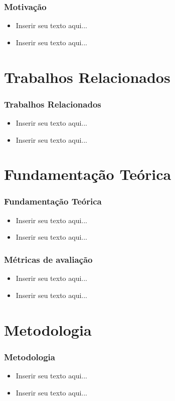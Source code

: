 \documentclass[aspectratio=34, 14pt]{latex-slides}
\begin{document}
\begin{frame}
    \frametitle{Motivação}

    \begin{itemize}
        \item Inserir seu texto aqui...
        \item Inserir seu texto aqui...
    \end{itemize}
\end{frame}

\section{Trabalhos Relacionados}
\begin{frame}
    \frametitle{Trabalhos Relacionados}

    \begin{itemize}
        \item Inserir seu texto aqui...
        \item Inserir seu texto aqui...
    \end{itemize}
\end{frame}

\section{Fundamentação Teórica}
\begin{frame}
    \frametitle{Fundamentação Teórica}

    \begin{itemize}
        \item Inserir seu texto aqui...
        \item Inserir seu texto aqui...
    \end{itemize}
\end{frame}

\begin{frame}
    \frametitle{Métricas de avaliação}

    \begin{itemize}
        \item Inserir seu texto aqui...
        \item Inserir seu texto aqui...
    \end{itemize}
\end{frame}

\section{Metodologia}
\begin{frame}
    \frametitle{Metodologia}

    \begin{itemize}
        \item Inserir seu texto aqui...
        \item Inserir seu texto aqui...
    \end{itemize}
\end{frame}
\end{document}
